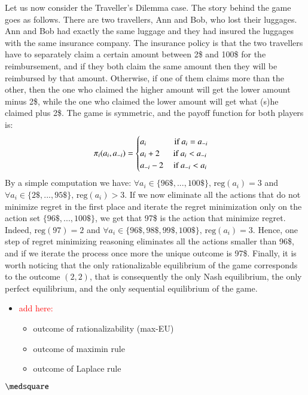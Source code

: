 \documentclass[fleqn,reqno,11pt]{article}
\begin{document}
\begin{example}
\label{example:TravelersDilemma}
Let us now consider the Traveller's Dilemma case. The story behind the game goes as
follows. There are two travellers, Ann and Bob, who lost their luggages. Ann and Bob had
exactly the same luggage and they had insured the luggages with the same insurance company. The
insurance policy is that the two travellers have to separately claim a certain amount between
2\$ and 100\$ for the reimbursement, and if they both claim the same amount then they will be
reimbursed by that amount. Otherwise, if one of them claims more than the other, then the one
who claimed the higher amount will get the lower amount minus 2\$, while the one who claimed
the lower amount will get what (s)he claimed plus 2\$. The game is symmetric, and the payoff
function for both players is:
\begin{align*}
  \pi_i(a_i,a_{-i}) = \begin{cases} a_i \text{ \hspace{1cm} if } a_i = a_{-i} \\ a_i + 2 \text{
      \hspace{.4cm} if } a_i < a_{-i} \\ a_{-i} -2 \text{ \hspace{.25cm} if } a_{-i} <
    a_i \end{cases}
\end{align*}
By a simple computation we have:  $\forall a_i \in \lbrace 96\$, ..., 100\$ \rbrace \text{, }
\text{reg}(a_i)=3 $ and $\forall a_i \in \lbrace 2\$, ..., 95\$ \rbrace \text{, }
\text{reg}(a_i)>3$. If we now eliminate all the actions that do not minimize regret in the
first place and iterate the regret minimization only on the action set $\lbrace 96\$, ...,
100\$ \rbrace$, we get that 97\$ is the action that minimize regret. Indeed, $\text{reg}(97)=2$
and $\forall a_i \in \lbrace 96\$, 98\$, 99\$, 100\$ \rbrace \text{, } \text{reg}(a_i)=3
$. Hence, one step of regret minimizing reasoning eliminates all the actions smaller than 96\$,
and if we iterate the process once more the unique outcome is 97\$. Finally, it is worth
noticing that the only rationalizable equilibrium of the game corresponds to the outcome
$(2,2)$, that is consequently the only Nash equilibrium, the only perfect equilibrium, and the
only sequential equilibrium of the game.

\begin{itemize}
\item \textcolor{red}{add here:}
  \begin{itemize}  
  \item outcome of rationalizability (max-EU)
  \item outcome of maximin rule
  \item outcome of Laplace rule
  \end{itemize}

\end{itemize}

 $ \medsquare $
  
\end{example}
\end{document}
